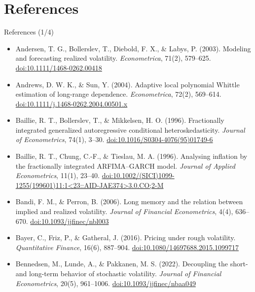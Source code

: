 \section{References}

\begin{frame}{References (1/4)}
\itemsize{\tiny}
\begin{itemize}
    \item Andersen, T. G., Bollerslev, T., Diebold, F. X., \& Labys, P. (2003). Modeling and forecasting realized volatility. \textit{Econometrica}, 71(2), 579--625. \href{https://doi.org/10.1111/1468-0262.00418}{doi:10.1111/1468-0262.00418}
    \item Andrews, D. W. K., \& Sun, Y. (2004). Adaptive local polynomial Whittle estimation of long-range dependence. \textit{Econometrica}, 72(2), 569--614. \href{https://doi.org/10.1111/j.1468-0262.2004.00501.x}{doi:10.1111/j.1468-0262.2004.00501.x}
    \item Baillie, R. T., Bollerslev, T., \& Mikkelsen, H. O. (1996). Fractionally integrated generalized autoregressive conditional heteroskedasticity. \textit{Journal of Econometrics}, 74(1), 3--30. \href{https://doi.org/10.1016/S0304-4076(95)01749-6}{doi:10.1016/S0304-4076(95)01749-6}
    \item Baillie, R. T., Chung, C.-F., \& Tieslau, M. A. (1996). Analysing inflation by the fractionally integrated ARFIMA--GARCH model. \textit{Journal of Applied Econometrics}, 11(1), 23--40. \href{https://doi.org/10.1002/(SICI)1099-1255(199601)11:1\%3C23::AID-JAE374\%3E3.0.CO;2-M}{doi:10.1002/(SICI)1099-1255(199601)11:1\textless{}23::AID-JAE374\textgreater{}3.0.CO;2-M}
    \item Bandi, F. M., \& Perron, B. (2006). Long memory and the relation between implied and realized volatility. \textit{Journal of Financial Econometrics}, 4(4), 636--670. \href{https://doi.org/10.1093/jjfinec/nbl003}{doi:10.1093/jjfinec/nbl003}
    \item Bayer, C., Friz, P., \& Gatheral, J. (2016). Pricing under rough volatility. \textit{Quantitative Finance}, 16(6), 887--904. \href{https://doi.org/10.1080/14697688.2015.1099717}{doi:10.1080/14697688.2015.1099717}
    \item Bennedsen, M., Lunde, A., \& Pakkanen, M. S. (2022). Decoupling the short- and long-term behavior of stochastic volatility. \textit{Journal of Financial Econometrics}, 20(5), 961--1006. \href{https://doi.org/10.1093/jjfinec/nbaa049}{doi:10.1093/jjfinec/nbaa049}

\end{itemize}
\end{frame}
